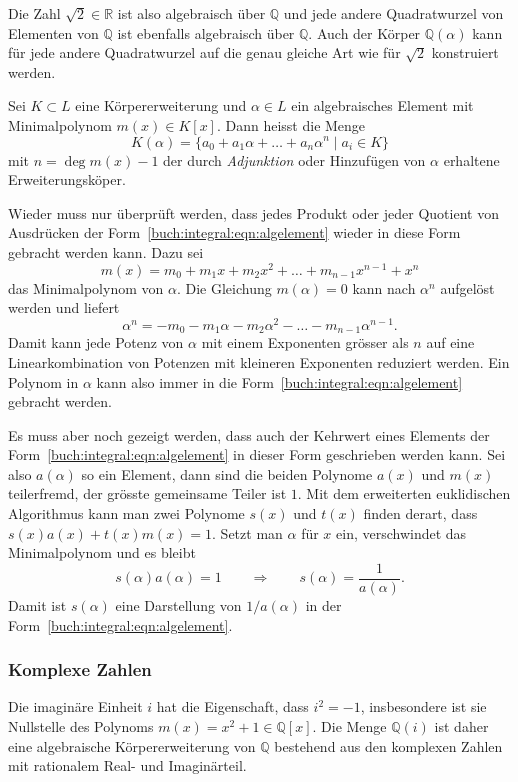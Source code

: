 Die Zahl $\sqrt{2}\in\mathbb{R}$ ist also algebraisch über $\mathbb{Q}$
und jede andere Quadratwurzel von Elementen von $\mathbb{Q}$ ist
ebenfalls algebraisch über $\mathbb{Q}$.
Auch der Körper $\mathbb{Q}(\alpha)$ kann für jede andere Quadratwurzel
auf die genau gleiche Art wie für $\sqrt{2}$ konstruiert werden.

\begin{definition}
\label{buch:integral:definition:algebraischeerweiterung}
Sei $K\subset L$ eine Körpererweiterung und $\alpha\in L$ ein algebraisches
Element mit Minimalpolynom $m(x)\in K[x]$.
Dann heisst die Menge
\begin{equation}
K(\alpha)
=
\{
a_0 + a_1\alpha + \ldots +a_n\alpha^n
\;|\;
a_i\in K
\}
\label{buch:integral:eqn:algelement}
\end{equation}
mit $n=\deg m(x) - 1$ der durch {\em Adjunktion} oder Hinzufügen
von $\alpha$ erhaltene Erweiterungsköper.
%
\end{definition}

Wieder muss nur überprüft werden, dass jedes Produkt oder jeder
Quotient von Ausdrücken der Form~\eqref{buch:integral:eqn:algelement}
wieder in diese Form gebracht werden kann.
Dazu sei
\[
m(x)
=
m_0+m_1x + m_2x^2
+\ldots +m_{n-1}x^{n-1} + x^n
\]
das Minimalpolynom von $\alpha$.
Die Gleichung $m(\alpha)=0$ kann nach $\alpha^n$ aufgelöst werden und
liefert
\[
\alpha^n = -m_0 - m_1\alpha - m_2\alpha^2 -\ldots -m_{n-1}\alpha^{n-1}.
\]
Damit kann jede Potenz von $\alpha$ mit einem Exponenten grösser als $n$
auf eine Linearkombination von Potenzen mit kleineren Exponenten
reduziert werden.
Ein Polynom in $\alpha$ kann also immer in die
Form~\eqref{buch:integral:eqn:algelement}
gebracht werden.

Es muss aber noch gezeigt werden, dass auch der Kehrwert eines Elements
der Form~\eqref{buch:integral:eqn:algelement} in dieser Form geschrieben
werden kann.
Sei also $a(\alpha)$ so ein Element, dann sind die beiden Polynome
$a(x)$ und $m(x)$ teilerfremd, der grösste gemeinsame Teiler ist $1$.
Mit dem erweiterten euklidischen Algorithmus kann man zwei Polynome
$s(x)$ und $t(x)$ finden derart, dass $s(x)a(x)+t(x)m(x)=1$.
Setzt man $\alpha$ für $x$ ein, verschwindet das Minimalpolynom und
es bleibt
\[
s(\alpha)a(\alpha) = 1
\qquad\Rightarrow\qquad
s(\alpha) = \frac{1}{a(\alpha)}.
\]
Damit ist $s(\alpha)$ eine Darstellung von $1/a(\alpha)$ in der 
Form~\eqref{buch:integral:eqn:algelement}.

%
%
\subsubsection{Komplexe Zahlen}
Die imaginäre Einheit $i$ hat die Eigenschaft, dass $i^2=-1$, insbesondere
%
%
%
ist sie Nullstelle des Polynoms $m(x)=x^2+1\in\mathbb{Q}[x]$.
Die Menge $\mathbb{Q}(i)$ ist daher eine algebraische Körpererweiterung
von $\mathbb{Q}$ bestehend aus den komplexen Zahlen mit rationalem
Real- und Imaginärteil.

